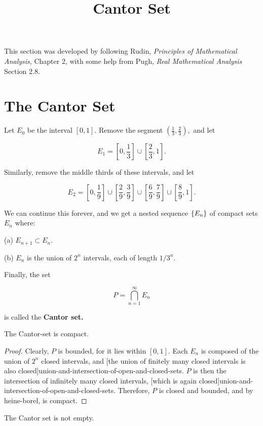 \documentclass{article}
\title{Cantor Set}
\begin{document}
\begin{note}\label{cantor-set-reference-note}
This section was developed by following Rudin, \emph{Principles of Mathematical Analysis}, Chapter 2, with some help from Pugh, \emph{Real Mathematical Analysis} Section 2.8.
\end{note}

\section{The Cantor Set}

\begin{definition}
Let $E_0$ be the \@{interval} $[0, 1].$ Remove the \@{segment} $(\frac{1}{3}, \frac{2}{3}),$ and let

\[ E_1 = [0, \frac{1}{3}] \cup [\frac{2}{3}, 1]. \]

Similarly, remove the middle thirds of these intervals, and let

\[ E_2 = [0, \frac{1}{9}] \cup [\frac{2}{9}, \frac{3}{9}] \cup [\frac{6}{9}, \frac{7}{9}] \cup [\frac{8}{9}, 1]. \]

We can continue this forever, and we get a nested \@{sequence} $\left\{ E_n \right\}$ of \@{compact} sets $E_n$  where:

(a) $E_{n+1} \subset E_n.$

(b) $E_n$ is the union of $2^n$ intervals, each of length $1/3^n.$

Finally, the set

\[ P = \bigcap_{n=1}^\infty E_n \]

is called the \textbf{Cantor set.}
\end{definition}

\begin{theorem}\label{cantor-set-is-compact}
The \@{Cantor-set} is \@{compact}.
\end{theorem}

\begin{proof}
Clearly, $P$ is \@{bounded}, for it lies within $[0, 1].$ Each $E_n$ is composed of the union of $2^n$ closed intervals, and \@[the union of finitely many closed intervals is also closed]{union-and-intersection-of-open-and-closed-sets}. $P$ is then the intersection of infinitely many closed intervals, \@[which is again closed]{union-and-intersection-of-open-and-closed-sets}. Therefore, $P$ is closed and bounded, and by \@{heine-borel}, is \@{compact}.
\end{proof}

\begin{theorem}\label{cantor-set-is-not-empty}
The Cantor set is not empty.
\end{theorem}
\end{document}
